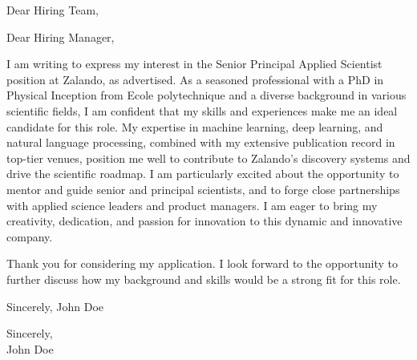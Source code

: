 \documentclass[a4paper,10pt]{letter}
\begin{document}
\begin{letter}{}
\opening{Dear Hiring Team,}

Dear Hiring Manager,

I am writing to express my interest in the Senior Principal Applied Scientist position at Zalando, as advertised. As a seasoned professional with a PhD in Physical Inception from Ecole polytechnique and a diverse background in various scientific fields, I am confident that my skills and experiences make me an ideal candidate for this role. My expertise in machine learning, deep learning, and natural language processing, combined with my extensive publication record in top-tier venues, position me well to contribute to Zalando's discovery systems and drive the scientific roadmap. I am particularly excited about the opportunity to mentor and guide senior and principal scientists, and to forge close partnerships with applied science leaders and product managers. I am eager to bring my creativity, dedication, and passion for innovation to this dynamic and innovative company.

Thank you for considering my application. I look forward to the opportunity to further discuss how my background and skills would be a strong fit for this role.

Sincerely,
John Doe

\closing{Sincerely,\\John Doe}

\end{letter}
\end{document}
